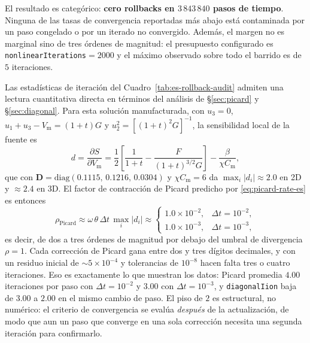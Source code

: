 \documentclass[11pt,a4paper]{article}
\newcommand{\code}[1]{\texttt{\small #1}}
\newcommand{\Vm}{V_{\text{m}}}
\newcommand{\Dten}{\mathbf{D}}
\begin{document}


\FloatBarrier

El resultado es categórico: \textbf{cero rollbacks en $3\,843\,840$ pasos de tiempo}. Ninguna
de las tasas de convergencia reportadas más abajo está contaminada por un paso congelado o
por un iterado no convergido. Además, el margen no es marginal sino de tres órdenes de
magnitud: el presupuesto configurado es \code{nonlinearIterations}$=2000$ y el máximo
observado sobre todo el barrido es de $5$ iteraciones.

Las estadísticas de iteración del Cuadro~\ref{tab:es-rollback-audit} admiten una lectura
cuantitativa directa en términos del análisis de \S\ref{sec:picard} y \S\ref{sec:diagonal}.
Para esta solución manufacturada, con $u_3=0$, $u_1+u_3-\Vm=(1+t)G$ y
$u_2^2=[(1+t)^2G]^{-1}$, la sensibilidad local de la fuente es
\begin{equation}
  d=\frac{\partial S}{\partial \Vm}
  =
  \frac{1}{2}\left[\frac{1}{1+t}-\frac{F}{(1+t)^{3/2}G}\right]
  -\frac{\beta}{\chi C_{\text{m}}},
  \label{eq:es-d-analitico}
\end{equation}
que con $\Dten=\mathrm{diag}(0.1115,\,0.1216,\,0.0304)$ y $\chi C_{\text{m}}=6$ da
$\max_i|d_i|\approx 2.0$ en 2D y $\approx 2.4$ en 3D. El factor de contracción de Picard
predicho por \eqref{eq:picard-rate-es} es entonces
\begin{equation}
  \rho_{\text{Picard}}\approx\omega\,\theta\,\Delta t\,\max_i|d_i|
  \approx
  \begin{cases}
    1.0\times10^{-2}, & \Delta t=10^{-2},\\
    1.0\times10^{-3}, & \Delta t=10^{-3},
  \end{cases}
  \label{eq:es-rho-numerico}
\end{equation}
es decir, de dos a tres órdenes de magnitud por debajo del umbral de divergencia
$\rho=1$. Cada corrección de Picard gana entre dos y tres dígitos decimales, y con un residuo
inicial de $\sim\!5\times10^{-4}$ y tolerancias de $10^{-8}$ hacen falta tres o cuatro
iteraciones. Eso es exactamente lo que muestran los datos: Picard promedia $4.00$ iteraciones
por paso con $\Delta t=10^{-2}$ y $3.00$ con $\Delta t=10^{-3}$, y \code{diagonalIion} baja de
$3.00$ a $2.00$ en el mismo cambio de paso. El piso de $2$ es estructural, no numérico: el
criterio de convergencia se evalúa \emph{después} de la actualización, de modo que aun un
paso que converge en una sola corrección necesita una segunda iteración para confirmarlo.
\end{document}

